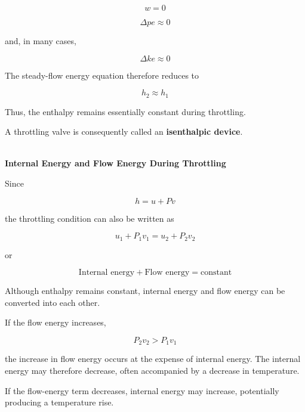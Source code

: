 \documentclass[12pt]{article}
\begin{document}
\begin{equation*}
w=0
\end{equation*}

\begin{equation*}
\Delta pe\approx0
\end{equation*}

and, in many cases,

\begin{equation*}
\Delta ke\approx0
\end{equation*}

The steady-flow energy equation therefore reduces to

\begin{equation*}
h_2\approx h_1
\end{equation*}

Thus, the enthalpy remains essentially constant during throttling.

A throttling valve is consequently called an \textbf{isenthalpic device}.

\textbf{\\ Internal Energy and Flow Energy During Throttling}

Since

\begin{equation*}
h=u+Pv
\end{equation*}

the throttling condition can also be written as

\begin{equation*}
u_1+P_1v_1
=
u_2+P_2v_2
\end{equation*}

or

\begin{equation*}
\text{Internal energy}+\text{Flow energy}
=
\text{constant}
\end{equation*}

Although enthalpy remains constant, internal energy and flow energy can be converted into each other.

If the flow energy increases,

\begin{equation*}
P_2v_2>P_1v_1
\end{equation*}

the increase in flow energy occurs at the expense of internal energy. The internal energy may therefore decrease, often accompanied by a decrease in temperature.

If the flow-energy term decreases, internal energy may increase, potentially producing a temperature rise.
\end{document}
